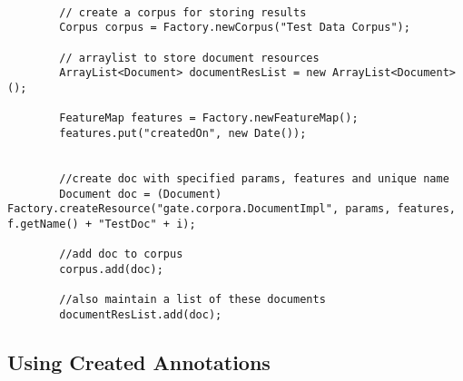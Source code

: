 \documentclass[a4paper,12pt]{report}
\begin{document}
\begin{lstlisting}

		// create a corpus for storing results
		Corpus corpus = Factory.newCorpus("Test Data Corpus");
		
		// arraylist to store document resources
		ArrayList<Document> documentResList = new ArrayList<Document>();
		
		FeatureMap features = Factory.newFeatureMap();
		features.put("createdOn", new Date());
		
		
		//create doc with specified params, features and unique name
		Document doc = (Document) Factory.createResource("gate.corpora.DocumentImpl", params, features, f.getName() + "TestDoc" + i);
		
		//add doc to corpus
		corpus.add(doc);
			
		//also maintain a list of these documents
		documentResList.add(doc);
\end{lstlisting}


\subsection{Using Created Annotations}
\label{sec:java3}
\end{document}
